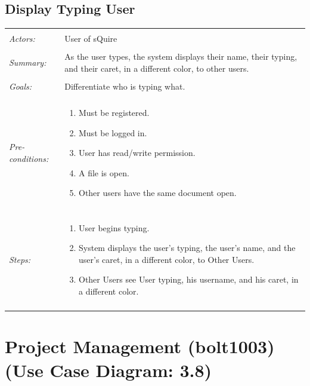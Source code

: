 \documentclass[11pt]{report}
\begin{document}
\subsection{Display Typing User}
\begin{tabular}{ p{2cm} p{12cm} }
\hline \\
	\textit{Actors:} & User of sQuire \\
	\\
	\textit{Summary:} & As the user types, the system displays their name, their typing, and their caret, in a different color, to other users. \\
	\\
	\textit{Goals:} & Differentiate who is typing what. \\
	\\
	\textit{Pre-conditions:} & \begin{enumerate}
		\item Must be registered.
		\item Must be logged in.
		\item User has read/write permission.
		\item A file is open.
		\item Other users have the same document open.
	\end{enumerate} \\
	\\
	\textit{Steps:} & \begin{enumerate}
		\item User begins typing.
		\item System displays the user's typing, the user's name, and the user's caret, in a different color, to Other Users.
		\item Other Users see User typing, his username, and his caret, in a different color.
	\end{enumerate} \\
	\\
\hline
\end{tabular}
\newpage

\section{Project Management (bolt1003) (Use Case Diagram: 3.8)}
\end{document}
